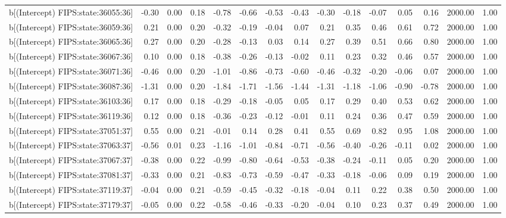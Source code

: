 \begin{table}[ht]
\begin{tabular}{rrrrrrrrrrrrrrr}
  b[(Intercept) FIPS:state:36055:36] & -0.30 & 0.00 & 0.18 & -0.78 & -0.66 & -0.53 & -0.43 & -0.30 & -0.18 & -0.07 & 0.05 & 0.16 & 2000.00 & 1.00 \\ 
  b[(Intercept) FIPS:state:36059:36] & 0.21 & 0.00 & 0.20 & -0.32 & -0.19 & -0.04 & 0.07 & 0.21 & 0.35 & 0.46 & 0.61 & 0.72 & 2000.00 & 1.00 \\ 
  b[(Intercept) FIPS:state:36065:36] & 0.27 & 0.00 & 0.20 & -0.28 & -0.13 & 0.03 & 0.14 & 0.27 & 0.39 & 0.51 & 0.66 & 0.80 & 2000.00 & 1.00 \\ 
  b[(Intercept) FIPS:state:36067:36] & 0.10 & 0.00 & 0.18 & -0.38 & -0.26 & -0.13 & -0.02 & 0.11 & 0.23 & 0.32 & 0.46 & 0.57 & 2000.00 & 1.00 \\ 
  b[(Intercept) FIPS:state:36071:36] & -0.46 & 0.00 & 0.20 & -1.01 & -0.86 & -0.73 & -0.60 & -0.46 & -0.32 & -0.20 & -0.06 & 0.07 & 2000.00 & 1.00 \\ 
  b[(Intercept) FIPS:state:36087:36] & -1.31 & 0.00 & 0.20 & -1.84 & -1.71 & -1.56 & -1.44 & -1.31 & -1.18 & -1.06 & -0.90 & -0.78 & 2000.00 & 1.00 \\ 
  b[(Intercept) FIPS:state:36103:36] & 0.17 & 0.00 & 0.18 & -0.29 & -0.18 & -0.05 & 0.05 & 0.17 & 0.29 & 0.40 & 0.53 & 0.62 & 2000.00 & 1.00 \\ 
  b[(Intercept) FIPS:state:36119:36] & 0.12 & 0.00 & 0.18 & -0.36 & -0.23 & -0.12 & -0.01 & 0.11 & 0.24 & 0.36 & 0.47 & 0.59 & 2000.00 & 1.00 \\ 
  b[(Intercept) FIPS:state:37051:37] & 0.55 & 0.00 & 0.21 & -0.01 & 0.14 & 0.28 & 0.41 & 0.55 & 0.69 & 0.82 & 0.95 & 1.08 & 2000.00 & 1.00 \\ 
  b[(Intercept) FIPS:state:37063:37] & -0.56 & 0.01 & 0.23 & -1.16 & -1.01 & -0.84 & -0.71 & -0.56 & -0.40 & -0.26 & -0.11 & 0.02 & 2000.00 & 1.00 \\ 
  b[(Intercept) FIPS:state:37067:37] & -0.38 & 0.00 & 0.22 & -0.99 & -0.80 & -0.64 & -0.53 & -0.38 & -0.24 & -0.11 & 0.05 & 0.20 & 2000.00 & 1.00 \\ 
  b[(Intercept) FIPS:state:37081:37] & -0.33 & 0.00 & 0.21 & -0.83 & -0.73 & -0.59 & -0.47 & -0.33 & -0.18 & -0.06 & 0.09 & 0.19 & 2000.00 & 1.00 \\ 
  b[(Intercept) FIPS:state:37119:37] & -0.04 & 0.00 & 0.21 & -0.59 & -0.45 & -0.32 & -0.18 & -0.04 & 0.11 & 0.22 & 0.38 & 0.50 & 2000.00 & 1.00 \\ 
  b[(Intercept) FIPS:state:37179:37] & -0.05 & 0.00 & 0.22 & -0.58 & -0.46 & -0.33 & -0.20 & -0.04 & 0.10 & 0.23 & 0.37 & 0.49 & 2000.00 & 1.00 \\ 

\end{tabular}
\end{table}
